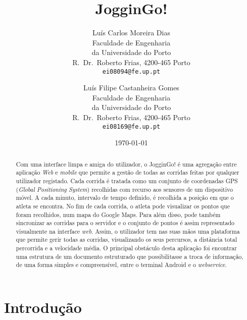 \documentclass[twocolumn,twoside,10pt,a4paper]{article}
\title{JogginGo! }
\author{Luís Carlos Moreira Dias\\
\small Faculdade de Engenharia\\[-0.8ex]
\small da Universidade do Porto\\[-0.8ex]
\small R.\ Dr.\ Roberto Frias, 4200-465 Porto\\[-0.8ex]
\small \texttt{ei08094@fe.up.pt}\\
\and
Luís Filipe Castanheira Gomes\\
\small Faculdade de Engenharia\\[-0.8ex]
\small da Universidade do Porto\\[-0.8ex]
\small R.\ Dr.\ Roberto Frias, 4200-465 Porto\\[-0.8ex]
\small \texttt{ei08169@fe.up.pt}
}
\date{\today}
\begin{document}
\maketitle
\thispagestyle{plain} 

\begin{abstract}
Com uma interface limpa e amiga do utilizador, o JogginGo! é uma agregação entre aplicação \textit{Web} e \textit{mobile} que permite a gestão de todas as corridas feitas por qualquer utilizador registado. Cada corrida é tratada como um conjunto de coordenadas GPS (\textit{Global Positioning System}) recolhidas com recurso aos sensores de um dispositivo móvel. A cada minuto, intervalo de tempo definido, é recolhida a posição em que o atleta se encontra. No fim de cada corrida, o atleta pode visualizar os pontos que foram recolhidos, num mapa do Google Maps. Para além disso, pode também sincronizar as corridas para o servidor e o conjunto de pontos é assim representado visualmente na interface \textit{web}. Assim, o utilizador tem nas suas mãos uma plataforma que permite gerir todas as corridas, visualizando os seus percursos, a distância total percorrida e a velocidade média. O principal obstáculo desta aplicação foi encontrar uma estrutura de um documento estruturado que possibilitasse a troca de informação, de uma forma simples e compreensível, entre o terminal Android e o \textit{webservice}.
\end{abstract}

\section{Introdução}\label{sec:intro}
\end{document}
